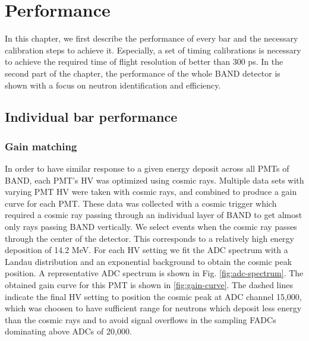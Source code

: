 \documentclass[3p,final,twocolumn]{elsarticle}
\begin{document}
\section{Performance}
In this chapter, we first describe the performance of every bar and the necessary calibration steps to achieve it. Especially, a set of timing calibrations is necessary to achieve the required time of flight resolution of better than 300 \si{\pico\s}.
In the second part of the chapter, the performance of the whole BAND detector is shown with a focus on neutron identification and efficiency.
\subsection{Individual bar performance}
\subsubsection{Gain matching}
In order to have similar response to a given energy deposit across all PMTs of BAND, each PMT's HV was optimized using
cosmic rays. Multiple data sets with varying PMT HV were taken with cosmic rays, and combined to produce a gain curve for 
each PMT. These data was collected with a cosmic trigger which required a cosmic ray passing through an individual layer of BAND to get almost only rays passing BAND vertically.
We select events when the cosmic ray passes through the center of the detector. This corresponds to a relatively high energy deposition of 14.2 \si{\mega\eV}. For each HV setting we fit 
the ADC spectrum with a Landau distribution and an exponential background to obtain the cosmic peak position. A representative ADC spectrum is shown in Fig. \ref{fig:adc-spectrum}.
The obtained gain curve for this PMT is shown in \ref{fig:gain-curve}. The dashed lines indicate the final HV setting to position the cosmic peak at ADC channel 15,000, which was choosen to have sufficient range for neutrons which deposit less energy than the cosmic rays and to avoid signal overflows in the sampling FADCs dominating above ADCs of 20,000.
\end{document}
